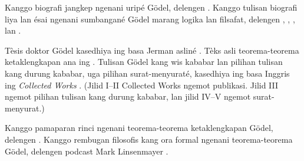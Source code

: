 \documentclass[../../../include/open-logic-section]{subfiles}
\begin{document}
\begin{reading}
Kanggo biografi jangkep ngenani
uripé G{\"o}del, delengen
\citet{Dawson1997}. Kanggo tulisan
biografi liya lan ésai ngenani
sumbangané G{\"o}del marang
logika lan filsafat, delengen
\citet{Wang1990}, \citet{Baaz2011},
\citet{Takeuti2003}, lan
\citet{Sigmund2007}.

Tèsis doktor G{\"o}del kasedhiya
ing basa Jerman asliné
\citep{Godel1929}. Tèks asli
teorema-teorema ketaklengkapan
ana ing \citep{Godel1931}.
Tulisan G\"odel kang wis kababar
lan pilihan tulisan kang durung kababar,
uga pilihan surat-menyuraté,
kasedhiya ing basa Inggris
ing \emph{Collected Works}
\citet{Godel1986,Godel1990}.
(Jilid I--II Collected Works ngemot publikasi. Jilid III ngemot pilihan tulisan kang durung kababar, lan jilid IV--V ngemot surat-menyurat.)

Kanggo pamaparan rinci ngenani
teorema-teorema ketaklengkapan
G{\"o}del, delengen
\citet{Smith2013}. Kanggo
rembugan filosofis kang ora
formal ngenani teorema-teorema
G{\"o}del, delengen podcast
Mark Linsenmayer
\citep{Linsenmayer2014}.
\end{reading}
\end{document}

